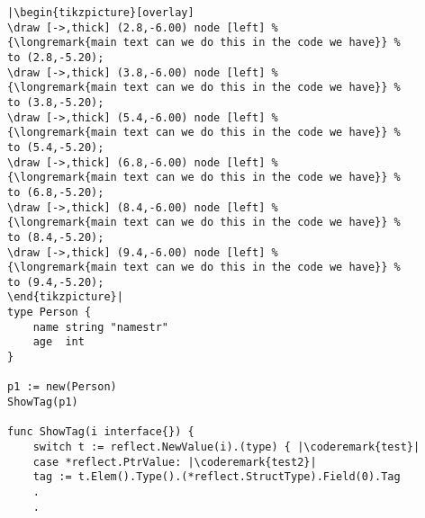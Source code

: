 \begin{lstlisting}[caption=Introspection using reflection,label=src:introspection]
|\begin{tikzpicture}[overlay]
\draw [->,thick] (2.8,-6.00) node [left] %
{\longremark{main text can we do this in the code we have}} %
to (2.8,-5.20);
\draw [->,thick] (3.8,-6.00) node [left] %
{\longremark{main text can we do this in the code we have}} %
to (3.8,-5.20);
\draw [->,thick] (5.4,-6.00) node [left] %
{\longremark{main text can we do this in the code we have}} %
to (5.4,-5.20);
\draw [->,thick] (6.8,-6.00) node [left] %
{\longremark{main text can we do this in the code we have}} %
to (6.8,-5.20);
\draw [->,thick] (8.4,-6.00) node [left] %
{\longremark{main text can we do this in the code we have}} %
to (8.4,-5.20);
\draw [->,thick] (9.4,-6.00) node [left] %
{\longremark{main text can we do this in the code we have}} %
to (9.4,-5.20);
\end{tikzpicture}|
type Person {
    name string "namestr"
    age  int
}

p1 := new(Person)
ShowTag(p1)

func ShowTag(i interface{}) {
    switch t := reflect.NewValue(i).(type) { |\coderemark{test}|
    case *reflect.PtrValue: |\coderemark{test2}|
	tag := t.Elem().Type().(*reflect.StructType).Field(0).Tag
	.
	.
\end{lstlisting}
